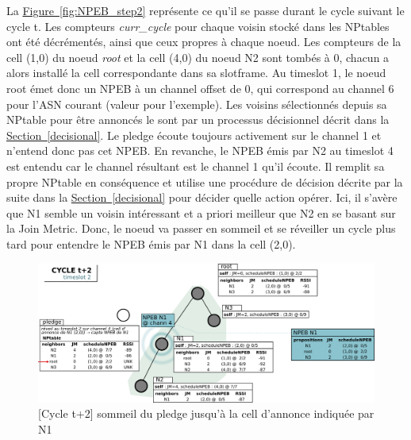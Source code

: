 \documentclass[]{report}
\newcommand{\wordlink}[2]{\hyperref[#2]{#1~\ref{#2}}}
\begin{document}
\newpage

La \wordlink{Figure}{fig:NPEB_step2} représente ce qu'il se passe durant le cycle suivant le cycle t. Les compteurs \textit{curr\_cycle} pour chaque voisin stocké dans les NPtables ont été décrémentés, ainsi que ceux propres à chaque noeud. Les compteurs de la cell (1,0) du noeud \textit{root} et la cell (4,0) du noeud N2 sont tombés à 0, chacun a alors installé la cell correspondante dans sa slotframe. Au timeslot 1, le noeud root émet donc un NPEB à un channel offset de 0, qui correspond au channel 6 pour l'ASN courant (valeur pour l'exemple). Les voisins sélectionnés depuis sa NPtable pour être annoncés le sont par un processus décisionnel décrit dans la \wordlink{Section}{decisional}. Le pledge écoute toujours activement sur le channel 1 et n'entend donc pas cet NPEB. En revanche, le NPEB émis par N2 au timeslot 4 est entendu car le channel résultant est le channel 1 qu'il écoute. Il remplit sa propre NPtable en conséquence et utilise une procédure de décision décrite par la suite dans la \wordlink{Section}{decisional} pour décider quelle action opérer. Ici, il s'avère que N1 semble un voisin intéressant et a priori meilleur que N2 en se basant sur la Join Metric. Donc, le noeud va passer en sommeil et se réveiller un cycle plus tard pour entendre le NPEB émis par N1 dans la cell (2,0).

 \vspace{1cm}
	\begin{figure}[!h]
	\centering
	\includegraphics[width=\linewidth]{NPEB_step3}
	\caption{[Cycle t+2] sommeil du pledge jusqu'à la cell d'annonce indiquée par N1}
	\label{fig:NPEB_step3}
	\end{figure}
\vspace{0.4cm}
\end{document}
